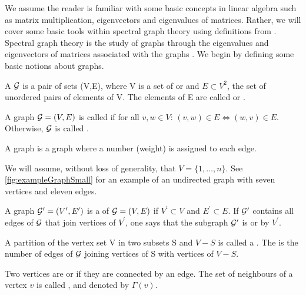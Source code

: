 We assume the reader is familiar with some basic concepts in linear algebra such as matrix multiplication, eigenvectors and eigenvalues of matrices. Rather, we will cover some basic tools within spectral graph theory using definitions from \cite{For10,New06a, Spi12, Spi07}. Spectral graph theory is the study of graphs through the eigenvalues and eigenvectors of matrices associated with the graphs \cite{Spi12}. We begin by defining some basic notions about graphs.
\begin{definition}
	\label{def:graph}
	A  $\mathcal G$ is a pair of sets (V,E), where V is a set of  or  and $E \subset V^{2}$, the set of unordered pairs of elements of V. The elements of E are called  or .
\end{definition}
\begin{definition}
	\label{def:undirectedGraph}
	A graph $\mathcal G = (V,E)$ is called  if for all $v,w \in V$: $(v,w) \in E \iff (w,v) \in E$. Otherwise, $\mathcal G$ is called .
\end{definition}
\begin{definition}
	\label{def:weightedGraph}
	A  graph is a graph where a number (weight) is assigned to each edge.
\end{definition}
We will assume, without loss of generality, that $V = \{1,\dots,n\}$. See \cref{fig:exampleGraphSmall} for an example of an undirected graph with seven vertices and eleven edges.
\begin{definition}
	\label{def:subGraph}
	A graph $\mathcal G^{\prime} = (V^{\prime},E^{\prime})$ is a  of $\mathcal G = (V,E)$ if $V^{\prime} \subset V$ and $E^{\prime} \subset E$. If $\mathcal G^{\prime}$ contains all edges of $\mathcal G$ that join vertices of $V^{\prime}$, one says that the subgraph $\mathcal G^{\prime}$ is  or  by $V^{\prime}$.
\end{definition}
\begin{definition}
	\label{def:cuts}
	A partition of the vertex set V in two subsets S and $V-S$ is called a . The  is the number of edges of $\mathcal G$ joining vertices of S with vertices of $V-S$.
\end{definition}
\begin{definition}
	\label{def:neighbourhoodNode}
	Two vertices are  or  if they are connected by an edge. The set of neighbours of a vertex $v$ is called , and denoted by $\Gamma(v)$.
\end{definition}
